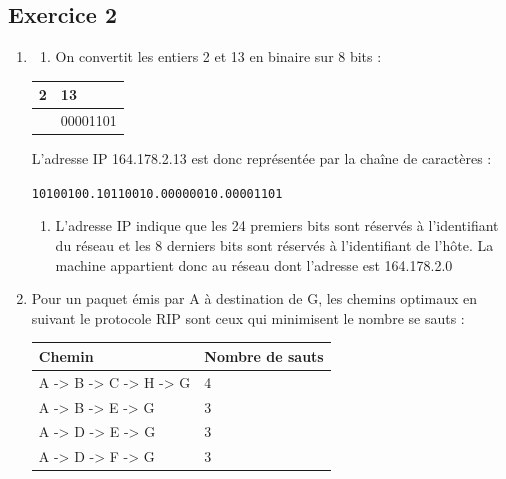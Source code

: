 \documentclass[
  letterpaper,
  DIV=11,
  numbers=noendperiod]{scrartcl}
\providecommand{\tightlist}{%
  \setlength{\itemsep}{0pt}\setlength{\parskip}{0pt}}\usepackage{longtable,booktabs,array}
\begin{document}
\hypertarget{exercice-2}{%
\subsection{Exercice 2}\label{exercice-2}}

\begin{enumerate}
\def\labelenumi{\arabic{enumi}.}
\item
  \begin{enumerate}
  \def\labelenumii{\alph{enumii}.}
  \tightlist
  \item
    On convertit les entiers 2 et 13 en binaire sur 8 bits :
  \end{enumerate}

  \begin{longtable}[]{@{}ll@{}}
  \toprule\noalign{}
  2 & 13 \\
  \midrule\noalign{}
  \endhead
  \bottomrule\noalign{}
  \endlastfoot
  00000010 & 00001101 \\
  \end{longtable}

  L'adresse IP 164.178.2.13 est donc représentée par la chaîne de
  caractères :

  \texttt{10100100.10110010.00000010.00001101}

  \begin{enumerate}
  \def\labelenumii{\alph{enumii}.}
  \setcounter{enumii}{1}
  \tightlist
  \item
    L'adresse IP indique que les 24 premiers bits sont réservés à
    l'identifiant du réseau et les 8 derniers bits sont réservés à
    l'identifiant de l'hôte. La machine appartient donc au réseau dont
    l'adresse est 164.178.2.0
  \end{enumerate}
\item
  Pour un paquet émis par A à destination de G, les chemins optimaux en
  suivant le protocole RIP sont ceux qui minimisent le nombre se sauts :

  \begin{longtable}[]{@{}ll@{}}
  \toprule\noalign{}
  Chemin & Nombre de sauts \\
  \midrule\noalign{}
  \endhead
  \bottomrule\noalign{}
  \endlastfoot
  A -\textgreater{} B -\textgreater{} C -\textgreater{} H
  -\textgreater{} G & 4 \\
  A -\textgreater{} B -\textgreater{} E -\textgreater{} G & 3 \\
  A -\textgreater{} D -\textgreater{} E -\textgreater{} G & 3 \\
  A -\textgreater{} D -\textgreater{} F -\textgreater{} G & 3 \\
  \end{longtable}


\end{enumerate}
\end{document}
